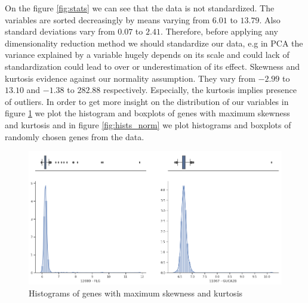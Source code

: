 \documentclass[12pt, wide]{mwart}
\begin{document}
On the figure \ref{fig:stats} we can see that the data is not standardized. The variables are sorted decreasingly by means varying from $6.01$ to $13.79$. Also standard deviations vary from $0.07$ to $2.41$. Therefore, before applying any dimensionality reduction method we should standardize our data, e.g in PCA the variance explained by a variable hugely depends on its scale and could lack of standardization could lead to over or underestimation of its effect. Skewness and kurtosis evidence against our normality assumption. They vary from $-2.99$ to $13.10$ and $-1.38$ to $282.88$ respectively. Especially, the kurtosis implies presence of outliers. In order to get more insight on the distribution of our variables in figure \ref{fig:hists_out} we plot the histogram and boxplots of genes with maximum skewness and kurtosis and in figure \ref{fig:hists_norm} we plot histograms and boxplots of randomly chosen genes from the data. 

\begin{figure}
\centering
\includegraphics[width=\textwidth]{images/hists_ouliers.png}
\caption{Histograms of genes with maximum skewness and kurtosis}
\label{fig:hists_out}
\end{figure}
\end{document}
